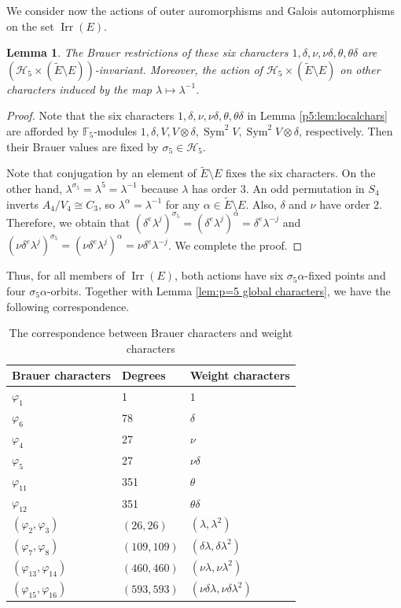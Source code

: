 \documentclass[11pt,a4paper]{article}
\numberwithin{equation}{section}
\newtheorem{lemma}[theorem]{Lemma}
\theoremstyle{definition}
\theoremstyle{remark}
\newcommand{\Irr}{\operatorname{Irr}}
\newcommand{\Sym}{\operatorname{Sym}}
\newcommand{\HH}{\mathcal H}
\newcommand{\FF}{\mathbb F}
\newcommand{\et}{\widetilde E}
\begin{document}
We consider now the actions of outer auromorphisms and Galois automorphisms on the set $\Irr(E)$.
\begin{lemma}\label{lem:p=5 local characters}
The Brauer restrictions of these six characters $1,\delta,\nu,\nu\delta,\theta,\theta\delta$ are $(\HH_5\times(\et\setminus E))$-invariant. 
Moreover, the action of $\HH_5\times(\et\setminus E)$ on other characters induced by the map $\lambda\mapsto\lambda^{-1}$.
\end{lemma}
\begin{proof}
Note that the six  characters $1,\delta,\nu,\nu\delta,\theta,\theta\delta$ in Lemma \ref{p5:lem:localchars} are afforded by \(\FF_5\)-modules  $1,\delta, V, V\otimes \delta, \Sym^2 V, \Sym^2 V\otimes \delta$, respectively. Then their Brauer values are fixed by 
\(\sigma_5\in\HH_5\).

Note that conjugation by an element of \(\et\setminus E\) fixes the six characters. On the other hand, $\lambda^{\sigma_5}=\lambda^5=\lambda^{-1}$ because 
$\lambda$ has order $3$. An odd permutation in \(S_4\) inverts \(A_4/V_4\cong C_3\), so $\lambda^\alpha=\lambda^{-1}$ for any $\alpha\in \et\setminus E$. Also, $\delta$ and $\nu$ have order $2$. Therefore, we obtain that
 $(\delta^e\lambda^j)^{\sigma_5}=(\delta^e\lambda^j)^\alpha=\delta^e\lambda^{-j}$ and
 $(\nu\delta^e\lambda^j)^{\sigma_5}=(\nu\delta^e\lambda^j)^\alpha=\nu\delta^e\lambda^{-j}$.
We complete the proof.
\end{proof}

Thus, for all members of $\Irr(E)$, both actions have
six  $\sigma_5\alpha$-fixed points and four 
$\sigma_5\alpha$-orbits. Together with Lemma \ref{lem:p=5 global characters}, we have the following correspondence.
\begin{table}[htbp]
\centering
\caption{The correspondence between Brauer characters and weight characters}\label{tab:7}
\begin{tabular}{lll}
\toprule
Brauer characters & Degrees & Weight characters\\
\midrule
\(\varphi_1\) & 1 & \(1\)\\
\(\varphi_6\) & 78 & \(\delta\)\\
\(\varphi_4\) & 27 & \(\nu\)\\
\(\varphi_5\) & 27 & \(\nu\delta\)\\
\(\varphi_{11}\) & 351 & \(\theta\)\\
\(\varphi_{12}\) & 351 & \(\theta\delta\)\\
\((\varphi_2,\varphi_3)\) & \((26,26)\) & \((\lambda,\lambda^2)\)\\
\((\varphi_7,\varphi_8)\) & \((109,109)\) & \((\delta\lambda,\delta\lambda^2)\)\\
\((\varphi_{13},\varphi_{14})\) & \((460,460)\) & \((\nu\lambda,\nu\lambda^2)\)\\
\((\varphi_{15},\varphi_{16})\) & \((593,593)\) & \((\nu\delta\lambda,\nu\delta\lambda^2)\)\\
\bottomrule
\end{tabular}
\end{table}
\end{document}
